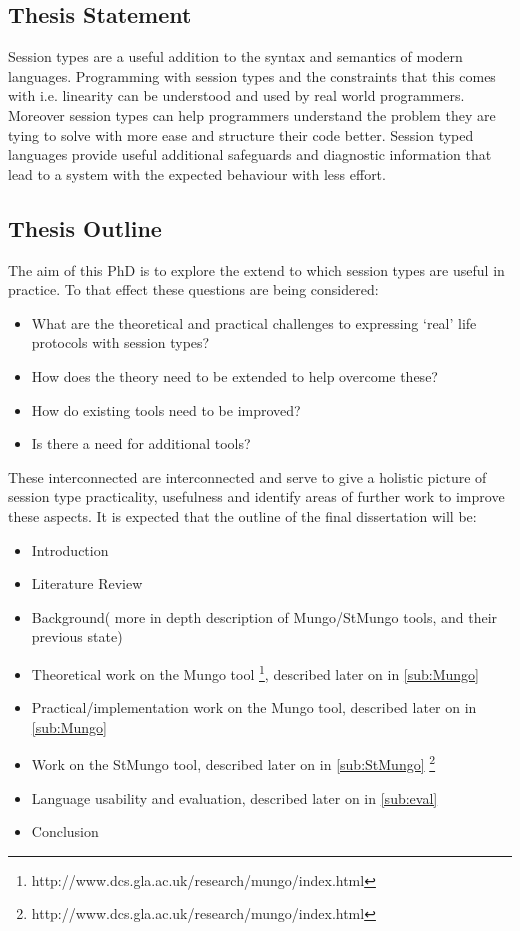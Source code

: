 \subsection{Thesis Statement}
Session types are a useful addition to the syntax and semantics of modern languages. Programming with session types and the constraints that this comes with i.e. linearity can be understood and used by real world programmers. Moreover session types can help programmers understand the problem they are tying to solve with more ease and structure their code better.
Session typed languages provide useful additional safeguards and diagnostic information that lead to a system with the expected behaviour with less effort.

\subsection{Thesis Outline}


The aim of this PhD is to explore the extend to which session types are useful in practice. To that effect these questions are being considered:

\begin{itemize}
\item What are the theoretical and practical challenges to expressing `real' life protocols with session types?
\item How does the theory need to be extended to help overcome these?
\item How do existing tools need to be improved?
\item Is there a need for additional tools?
\end{itemize}

These interconnected are interconnected and serve to give a holistic picture of session type practicality, usefulness and identify areas of further work to improve these aspects. It is expected that the outline of the final dissertation will be:

\begin{itemize}
  \item Introduction
  \item Literature Review
  \item Background( more in depth description of Mungo/StMungo tools, and their previous state)
  \item Theoretical work on the Mungo tool \footnote{http://www.dcs.gla.ac.uk/research/mungo/index.html}, described later on in \ref{sub:Mungo}
  \item Practical/implementation work on the Mungo tool, described later on in \ref{sub:Mungo}
  \item Work on the StMungo tool, described later on in \ref{sub:StMungo} \footnote{http://www.dcs.gla.ac.uk/research/mungo/index.html}
  \item Language usability and evaluation, described later on in \ref{sub:eval}
  \item Conclusion
\end{itemize}


